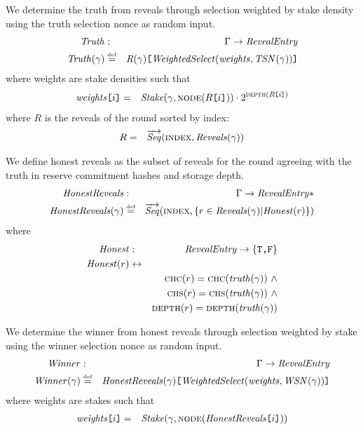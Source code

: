 \begin{definition}
\label{def:truth-selection}
We determine the truth from reveals through selection weighted by stake density using the truth selection nonce as random input. 
\begin{eqnarray}
\mathit{Truth}&:& \Gamma\to\mathit{RevealEntry}\\
\mathit{Truth}(\gamma)&\overset{\textrm{\tiny def}}{=}&\mathit{R}(\gamma)\texttt{[}\/\mathit{WeightedSelect}(\mathit{weights},\mathit{TSN}(\gamma))\/\texttt{]}
\end{eqnarray}
where weights are stake densities such that 
\begin{eqnarray}
\mathit{weights}\texttt{[}\/i\/\texttt{]}&=&\mathit{Stake}(\gamma,\textsc{node}(R\texttt{[}\/i\/\texttt{]}))\cdot 2^{\textsc{depth}(R\texttt{[}\/i\/\texttt{]})}
\end{eqnarray}
where $R$ is the reveals of the round sorted by index:
\begin{eqnarray}
R&=&\overrightarrow{\mathit{Seq}}(\textsc{index},\mathit{Reveals}(\gamma))
\end{eqnarray}
\end{definition}

\begin{definition}
We define honest reveals as the subset of reveals for the round agreeing with the truth in reserve commitment hashes and storage depth.
\label{def:honest-reveals}
\begin{eqnarray}
\mathit{HonestReveals}&:&\Gamma\to\mathit{RevealEntry}{*}\\
\mathit{HonestReveals}(\gamma)&\overset{\textrm{\tiny def}}{=}&\overrightarrow{\mathit{Seq}}(\textsc{index},\{r\in\mathit{Reveals}(\gamma)|\mathit{Honest}(r)\})
\end{eqnarray}
where
\begin{eqnarray}
\mathit{Honest}&:&\mathit{RevealEntry}\to\{\texttt{T,F}\}\\
\mathit{Honest}(r)&\leftrightarrow&\\
&&\textsc{chc}(r)=\textsc{chc}(\mathit{truth}(\gamma))\ \land\\
&&\textsc{chs}(r)=\textsc{chs}(\mathit{truth}(\gamma))\ \land\\
&&\textsc{depth}(r)=\textsc{depth}(\mathit{truth}(\gamma))
\end{eqnarray}
\end{definition}

\begin{definition}
\label{def:winner-selection}
We determine the winner from honest reveals through selection weighted by stake using the winner selection nonce as random input. 
\begin{eqnarray}
\mathit{Winner}&:& \Gamma\to\mathit{RevealEntry}\\
\mathit{Winner}(\gamma)&\overset{\textrm{\tiny def}}{=}&\mathit{HonestReveals}(\gamma)\texttt{[}\/\mathit{WeightedSelect}(\mathit{weights},\mathit{WSN}(\gamma))\/\texttt{]}
\end{eqnarray}
where weights are stakes such that 
\begin{eqnarray}
\mathit{weights}\texttt{[}\/i\/\texttt{]}&=&\mathit{Stake}(\gamma,\textsc{node}(\mathit{HonestReveals}\texttt{[}\/i\/\texttt{]}))
\end{eqnarray}
\end{definition}


